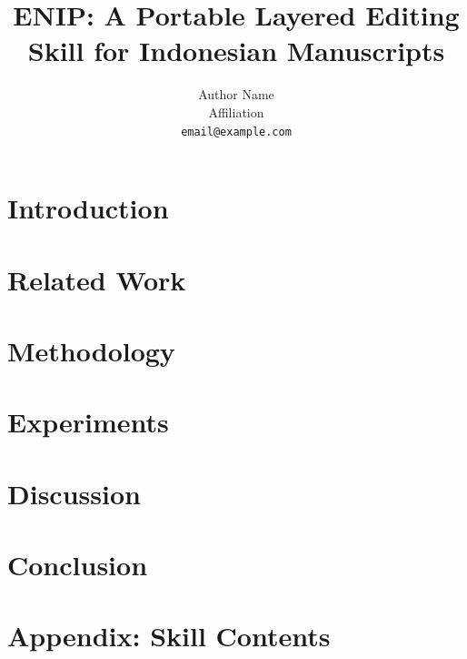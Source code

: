 \documentclass[10pt,twocolumn]{article}
\title{ENIP: A Portable Layered Editing Skill for Indonesian Manuscripts}
\author{Author Name \\ Affiliation \\ \texttt{email@example.com}}
\date{}
\begin{document}
\maketitle

\begin{abstract}

\end{abstract}

\section{Introduction}
\section{Related Work}
\section{Methodology}
\section{Experiments}
\section{Discussion}
\section{Conclusion}



\appendix
\section{Appendix: Skill Contents}
\end{document}
